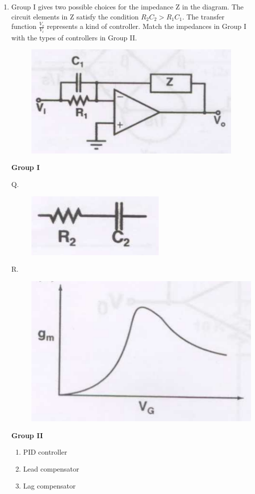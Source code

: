 \documentclass[a4paper, 11pt]{article}
\begin{document}
\begin{enumerate}
    \item Group I gives two possible choices for the impedance Z in the diagram. The circuit elements in Z satisfy the condition $R_2C_2 > R_1C_1$. The transfer function $\frac{V_o}{V_i}$ represents a kind of controller. Match the impedances in Group I with the types of controllers in Group II.
    \begin{figure}[H]
        \centering
        \includegraphics[width=0.6\columnwidth]{figs/q43.png}
        \caption*{}
        \label{fig:q43}
    \end{figure}
    
    \begin{minipage}{0.45\textwidth}
        \textbf{Group I}
        \begin{description}
            \item[Q.] \includegraphics[width=0.4\columnwidth]{figs/q43Q.png}
            \item[R.] \includegraphics[width=0.4\columnwidth]{figs/q45A.png}
        \end{description}
    \end{minipage}
    \begin{minipage}{0.45\textwidth}
        \textbf{Group II}
        \begin{enumerate}
            \item PID controller
            \item Lead compensator
            \item Lag compensator
        \end{enumerate}
    \end{minipage}


\end{enumerate}
\end{document}
